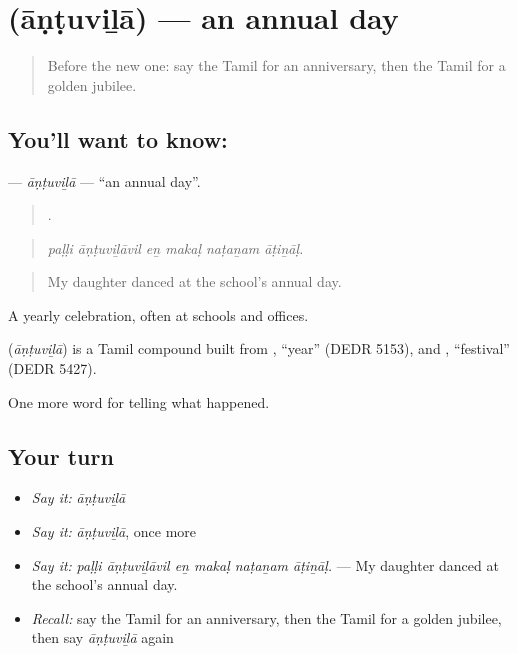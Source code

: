 \section[\texorpdfstring{\ta{ஆண்டுவிழா} (āṇṭuviḻā)}{ஆண்டுவிழா (āṇṭuviḻā)}]{ (āṇṭuviḻā) — an annual day}

\label{lesson:TA-C319-antuvila}



\begin{quote}
Before the new one: say the Tamil for an anniversary, then the Tamil for a golden jubilee.
\end{quote}

\subsection*{You'll want to know: }
\textbf{} — \emph{āṇṭuviḻā} — \textquotedblleft{}an annual day\textquotedblright{}.

\begin{quote}
     .
\end{quote}

\begin{quote}
\emph{paḷḷi āṇṭuviḻāvil eṉ makaḷ naṭaṉam āṭiṉāḷ.}
\end{quote}

\begin{quote}
My daughter danced at the school's annual day.
\end{quote}

A yearly celebration, often at schools and offices.

\begin{cousinweb}
\textbf{} (\emph{āṇṭuviḻā}) is a Tamil compound built from , \textquotedblleft{}year\textquotedblright{} (DEDR 5153), and , \textquotedblleft{}festival\textquotedblright{} (DEDR 5427).
\end{cousinweb}

\begin{grammarlens}[title={What you've built}]
One more word for telling what happened.
\end{grammarlens}

\subsection*{Your turn}
\begin{itemize}
\raggedright
  \item \emph{Say it:} \emph{āṇṭuviḻā}
  \item \emph{Say it:} \emph{āṇṭuviḻā}, once more
  \item \emph{Say it:} \emph{paḷḷi āṇṭuviḻāvil eṉ makaḷ naṭaṉam āṭiṉāḷ.} — My daughter danced at the school's annual day.
  \item \emph{Recall:} say the Tamil for an anniversary, then the Tamil for a golden jubilee, then say \emph{āṇṭuviḻā} again
\end{itemize}

